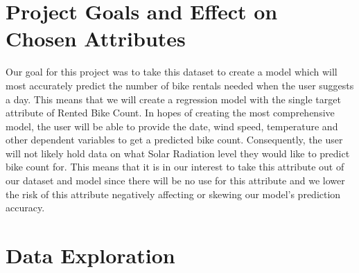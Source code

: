 \documentclass[main.tex]{subfiles}
\begin{document}
\section{Project Goals and Effect on Chosen Attributes}
Our goal for this project was to take this dataset to create a model which will most accurately predict the number of bike rentals needed when the user suggests a day. This means that we will create a regression model with the single target attribute of Rented Bike Count. In hopes of creating the most comprehensive model, the user will be able to provide the date, wind speed, temperature and other dependent variables to get a predicted bike count. Consequently, the user will not likely hold data on what Solar Radiation level they would like to predict bike count for. This means that it is in our interest to take this attribute out of our dataset and model since there will be no use for this attribute and we lower the risk of this attribute negatively affecting or skewing our model’s prediction accuracy. 


\section{Data Exploration}
\end{document}
